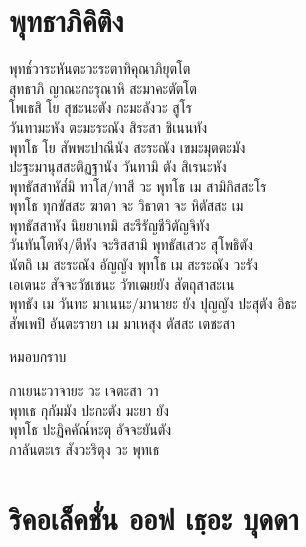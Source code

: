 \chapter{พุทธาภิคิติง}

\begin{leader}
\end{leader}

พุทธ๎วาระหันตะวะระตาทิคุณาภิยุตโต\\
สุทธาภิ ญาณะกะรุณาหิ สะมาคะตัตโต\\
โพเธสิ โย สุชะนะตัง กะมะลังวะ สูโร\\
วันทามะหัง ตะมะระณัง สิระสา ชิเนนทัง\\
พุทโธ โย สัพพะปาณีนัง สะระณัง เขมะมุตตะมัง\\
ปะฐะมานุสสะติฏฐานัง วันทามิ ตัง สิเรนะหัง\\
พุทธัสสาหัส๎มิ ทาโส/ทาสี วะ พุทโธ เม สามิกิสสะโร\\
พุทโธ ทุกขัสสะ ฆาตา จะ วิธาตา จะ หิตัสสะ เม\\
พุทธัสสาหัง นิยยาเทมิ สะรีรัญชีวิตัญจิทัง\\
วันทันโตหัง/ตีหัง จะริสสามิ พุทธัสเสวะ สุโพธิตัง\\
นัตถิ เม สะระณัง อัญญัง พุทโธ เม สะระณัง วะรัง\\
เอเตนะ สัจจะวัชเชนะ วัฑเฒยยัง สัตถุสาสะเน\\
พุทธัง เม วันทะ มาเนนะ/มานายะ ยัง ปุญญัง ปะสุตัง อิธะ\\
สัพเพปิ อันตะรายา เม มาเหสุง ตัสสะ เตชะสา\\

\begin{instruction}
หมอบกราบ
\end{instruction}

กาเยนะวาจายะ วะ เจตะสา วา\\
พุทเธ กุกัมมัง ปะกะตัง มะยา ยัง\\
พุทโธ ปะฏิคคัณ๎หะตุ อัจจะยันตัง\\
กาลันตะเร สังวะริตุง วะ พุทเธ

\clearpage

\chapter{ริคอเล็คชั่น ออฟ เธฺอะ บุดดา}

